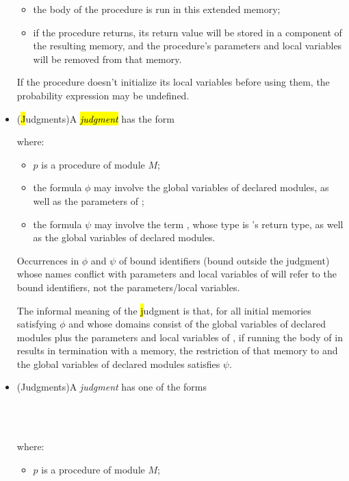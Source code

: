 \begin{itemize}
\begin{itemize}
\item the body of the procedure is run in this extended memory;

\item if the procedure returns, its return value will be stored in
  a component  of the resulting memory, and the procedure's
  parameters and local variables will be removed from that
  memory.
\end{itemize}
If the procedure doesn't initialize its local variables before using
them, the probability expression may be undefined.

\item (\hl Judgments)\quad A \hl \emph{judgment} has the form
  \begin{center}
  \end{center}
where:
\begin{itemize}
\item $p$ is a procedure of module $M$;

\item the formula $\phi$ may involve the global variables of declared
  modules, as well as the parameters of ;

\item the formula $\psi$ may involve the term , whose type is
  's return type, as well as the global variables of
  declared modules.
\end{itemize}
Occurrences in $\phi$ and $\psi$ of bound identifiers (bound outside
the judgment) whose names conflict with parameters and local
variables of  will refer to the bound identifiers, not the
parameters/local variables.

The informal meaning of the \hl judgment is that, for all initial
memories  satisfying $\phi$ and whose domains consist of the
global variables of declared modules plus the parameters and local
variables of , if running the body of  in
 results in termination with a memory, the restriction of that
memory to  and the global variables of declared modules
satisfies $\psi$.

\item (\phl Judgments)\quad A \phl \emph{judgment} has one of the forms
  \begin{center}
     \\
     \\
  \end{center}
where:
\begin{itemize}
\item $p$ is a procedure of module $M$;


\end{itemize}
\end{itemize}
